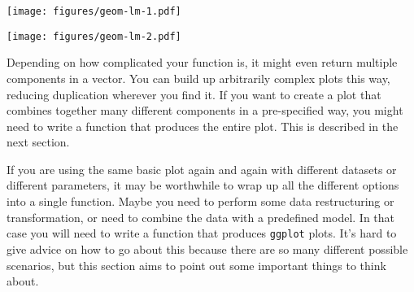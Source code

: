 \begin{Shaded}
\begin{Highlighting}[]
\StringTok{ } \StringTok{ }
  \NormalTok{(}  \NormalTok{, } \NormalTok{)}
\NormalTok{\}}
 \StringTok{ }\NormalTok{()}
\end{Highlighting}
\end{Shaded}

\texttt{[image: figures/geom-lm-1.pdf]}

\begin{Shaded}
\begin{Highlighting}[]
\NormalTok{(}\NormalTok{)}
 \StringTok{ }\StringTok{ }\NormalTok{))}
\end{Highlighting}
\end{Shaded}

\texttt{[image: figures/geom-lm-2.pdf]}

Depending on how complicated your function is, it might even return
multiple components in a vector. You can build up arbitrarily complex
plots this way, reducing duplication wherever you find it. If you want
to create a plot that combines together many different components in a
pre-specified way, you might need to write a function that produces the
entire plot. This is described in the next section.


If you are using the same basic plot again and again with different
datasets or different parameters, it may be worthwhile to wrap up all
the different options into a single function. Maybe you need to perform
some data restructuring or transformation, or need to combine the data
with a predefined model. In that case you will need to write a function
that produces \texttt{ggplot} plots. It's hard to give advice on how to
go about this because there are so many different possible scenarios,
but this section aims to point out some important things to think about.
 

